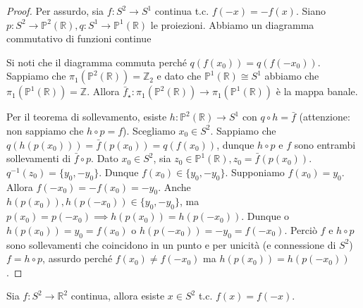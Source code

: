 \begin{proof}
  Per assurdo, sia $f:S^2 \rightarrow S^1$ continua t.c. $f(-x)=-f(x)$. Siano $p:S^2 \rightarrow \mathbb{P}^2(\mathbb{R}), q:S^1 \rightarrow \mathbb{P}^1(\mathbb{R})$ le proiezioni. Abbiamo un diagramma commutativo di funzioni continue
  \begin{center}
   \end{center}
  Si noti che il diagramma commuta perché $q(f(x_0))=q(f(-x_0))$. Sappiamo che $\pi_1(\mathbb{P}^2(\mathbb{R}))=\mathbb{Z}_2$ e dato che $\mathbb{P}^1(\mathbb{R}) \cong S^1$ abbiamo che $\pi_1(\mathbb{P}^1(\mathbb{R}))=\mathbb{Z}$.
  Allora $\bar{f}_{\star}:\pi_1(\mathbb{P}^2(\mathbb{R})) \rightarrow \pi_1(\mathbb{P}^1(\mathbb{R}))$ è la mappa banale.
  \begin{center}
  \end{center}
  Per il teorema di sollevamento, esiste $h:\mathbb{P}^2(\mathbb{R}) \rightarrow S^1$ con $q \circ h=\bar{f}$ (attenzione: non sappiamo che $h \circ p=f$). Scegliamo $x_0 \in S^2$. Sappiamo che $q(h(p(x_0)))=\bar{f}(p(x_0))=q(f(x_0))$, dunque $h \circ p$ e $f$ sono entrambi sollevamenti di $\bar{f} \circ p$.
  Dato $x_0 \in S^2$, sia $z_0 \in \mathbb{P}^1(\mathbb{R}), z_0=\bar{f}(p(x_0))$. $q^{-1}(z_0)=\{y_0, -y_0\}$. Dunque $f(x_0) \in \{y_0, -y_0\}$. Supponiamo $f(x_0)=y_0$. Allora $f(-x_0)=-f(x_0)=-y_0$.
  Anche $h(p(x_0)), h(p(-x_0)) \in \{y_0, -y_0\}$, ma $p(x_0)=p(-x_0) \implies h(p(x_0))=h(p(-x_0))$. Dunque o $h(p(x_0))=y_0=f(x_0)$ o $h(p(-x_0))=-y_0=f(-x_0)$. Perciò $f$ e $h \circ p$ sono sollevamenti che coincidono in un punto e per unicità (e connessione di $S^2$) $f=h \circ p$, assurdo perché $f(x_0) \not=f(-x_0)$ ma $h(p(x_0))=h(p(-x_0))$.
\end{proof}

\begin{cor}
  Sia $f: S^2 \rightarrow \mathbb{R}^2$ continua, allora esiste $x \in S^2$ t.c. $f(x)=f(-x)$.
\end{cor}

